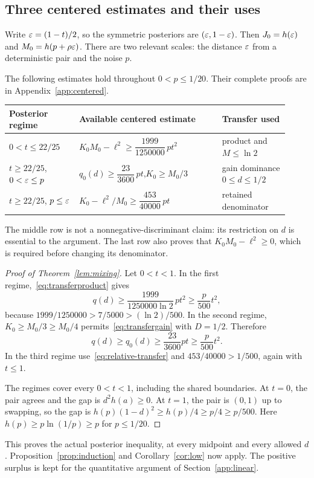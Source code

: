\subsection{Three centered estimates and their uses}\label{sec:scalarfinish}
Write $\varepsilon=(1-t)/2$, so the symmetric posteriors are $(\varepsilon,1-\varepsilon)$. Then $J_0=h(\varepsilon)$ and $M_0=h(p+\rho\varepsilon)$. There are two relevant scales: the distance $\varepsilon$ from a deterministic pair and the noise $p$.

The following estimates hold throughout $0<p\le1/20$. Their complete proofs are in Appendix~\ref{app:centered}.
\begin{center}
\renewcommand{\arraystretch}{1.45}
\begin{tabular}{@{}p{0.23\linewidth}p{0.47\linewidth}p{0.22\linewidth}@{}}
\toprule
Posterior regime & Available centered estimate & Transfer used\\
\midrule
$0<t\le22/25$ & $K_0M_0-\ell^2\ge\dfrac{1999}{1250000}\,pt^2$ & product and $M\le\ln2$\\
$t\ge22/25$, $0<\varepsilon\le p$ & $q_0(d)\ge\dfrac{23}{3600}\,pt$,\quad $K_0\ge M_0/3$ & \shortstack[l]{gain dominance\\$0\le d\le1/2$}\\
$t\ge22/25$, $p\le\varepsilon$ & $K_0-\ell^2/M_0\ge\dfrac{453}{40000}\,pt$ & retained denominator\\
\bottomrule
\end{tabular}
\end{center}
The middle row is not a nonnegative-discriminant claim: its restriction on $d$ is essential to the argument. The last row also proves that $K_0M_0-\ell^2\ge0$, which is required before changing its denominator.

\begin{proof}[Proof of Theorem~\ref{lem:mixing}]
Let $0<t<1$. In the first regime,~\eqref{eq:transferproduct} gives
\[
 q(d)\ge\frac{1999}{1250000\ln2}\,pt^2\ge\frac p{500}t^2,
\]
because $1999/1250000>7/5000>(\ln2)/500$. In the second regime, $K_0\ge M_0/3\ge M_0/4$ permits~\eqref{eq:transfergain} with $D=1/2$. Therefore
\[
 q(d)\ge q_0(d)\ge\frac{23}{3600}pt\ge\frac p{500}t^2.
\]
In the third regime use~\eqref{eq:relative-transfer} and $453/40000>1/500$, again with $t\le1$.

The regimes cover every $0<t<1$, including the shared boundaries. At $t=0$, the pair agrees and the gap is $d^2h(a)\ge0$. At $t=1$, the pair is $(0,1)$ up to swapping, so the gap is $h(p)(1-d)^2\ge h(p)/4\ge p/4\ge p/500$. Here $h(p)\ge p\ln(1/p)\ge p$ for $p\le1/20$.
\end{proof}
This proves the actual posterior inequality, at every midpoint and every allowed $d$. Proposition~\ref{prop:induction} and Corollary~\ref{cor:low} now apply. The positive surplus is kept for the quantitative argument of Section~\ref{app:linear}.
